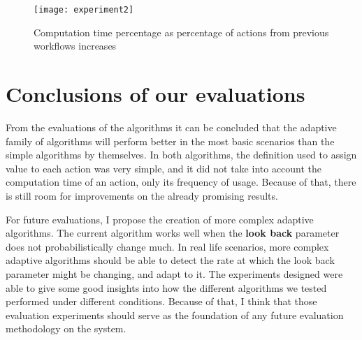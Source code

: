 \begin{figure}
\centering
\texttt{[image: experiment2]}
\caption{Computation time percentage as percentage of actions from previous workflows increases}
\label{fig:experiment2}
\end{figure}

\section{Conclusions of our evaluations}
From the evaluations of the algorithms it can be concluded that the adaptive family of algorithms will perform better in the most basic scenarios than the simple algorithms by themselves.  In both algorithms, the definition used to assign value to each action was very simple, and it did not take into account the computation time of an action, only its frequency of usage.  Because of that, there is still room for improvements on the already promising results. 

For future evaluations, I propose the creation of more complex adaptive algorithms.  The current algorithm works well when the \textbf{look back} parameter does not probabilistically change much.  In real life scenarios, more complex adaptive algorithms should be able to detect the rate at which the look back parameter might be changing, and adapt to it.
The experiments designed were able to give some good insights into how the different algorithms we tested performed under different conditions. Because of that, I think that those evaluation experiments should serve as the foundation of any future evaluation methodology on the system. 